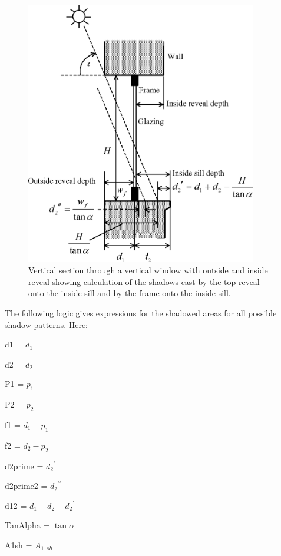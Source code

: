 \begin{figure}[hbtp] %
\centering
\includegraphics[width=0.9\textwidth, height=0.9\textheight, keepaspectratio=true]{media/image1607.png}
\caption{Vertical section through a vertical window with outside and inside reveal showing calculation of the shadows cast by the top reveal onto the inside sill and by the frame onto the inside sill. \protect \label{fig:vertical-section-through-a-vertical-window}}
\end{figure}

The following logic gives expressions for the shadowed areas for all possible shadow patterns. Here:

d1 = \({d_1}\)

d2 = \({d_2}\)

P1 = \({p_1}\)

P2 = \({p_2}\)

f1 = \({d_1} - {p_1}\)

f2 = \({d_2} - {p_2}\)

d2prime = \({d_2}^\prime\)

d2prime2 = \({d_2}^{\prime \prime }\)

d12 = \({d_1} + {d_2} - {d_2}^\prime\)

TanAlpha = \(\tan \alpha\)

A1sh = \({A_{1,sh}}\)

